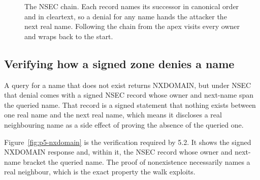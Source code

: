 \documentclass[11pt]{article}
\begin{document}
\begin{figure}[H]
\centering
{}
\caption{The NSEC chain. Each record names its successor in canonical order and in cleartext, so a denial for any name hands the attacker the next real name. Following the chain from the apex visits every owner and wraps back to the start.}
\label{fig:p5-nsec}
\end{figure}

\subsection{Verifying how a signed zone denies a name}

A query for a name that does not exist returns NXDOMAIN, but under NSEC that denial
comes with a signed NSEC record whose owner and next-name span the queried name.
That record is a signed statement that nothing exists between one real name and the
next real name, which means it discloses a real neighbouring name as a side effect
of proving the absence of the queried one.


Figure~\ref{fig:p5-nxdomain} is the verification required by 5.2.
It shows the signed NXDOMAIN response and, within it, the NSEC record whose
owner and next-name bracket the queried name. The proof of nonexistence
necessarily names a real neighbour, which is the exact property the walk exploits.
\end{document}
